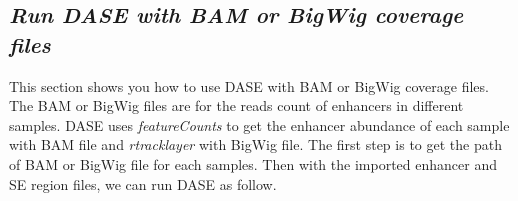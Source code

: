 \documentclass[
]{article}
\begin{document}
\hypertarget{run-dase-with-bam-or-bigwig-coverage-files}{%
\subsection{\texorpdfstring{\emph{Run DASE with BAM or BigWig coverage
files}}{Run DASE with BAM or BigWig coverage files}}\label{run-dase-with-bam-or-bigwig-coverage-files}}

This section shows you how to use DASE with BAM or BigWig coverage
files. The BAM or BigWig files are for the reads count of enhancers in
different samples. DASE uses \emph{featureCounts} to get the enhancer
abundance of each sample with BAM file and \emph{rtracklayer} with
BigWig file. The first step is to get the path of BAM or BigWig file for
each samples. Then with the imported enhancer and SE region files, we
can run DASE as follow.
\end{document}
